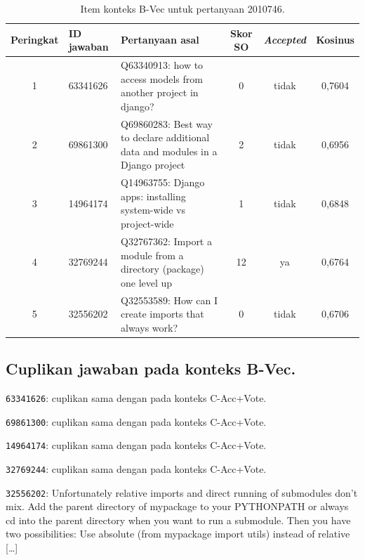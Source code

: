 \begin{table}[!htbp]
\centering
\scriptsize
\caption{Item konteks B-Vec untuk pertanyaan 2010746.}
\label{tab:lamp-x-konteks-b}
\renewcommand{\arraystretch}{1.25}
\begin{tabularx}{\textwidth}{|c|l|>{\raggedright\arraybackslash}X|c|c|c|}
\hline
\textbf{Peringkat} & \textbf{ID jawaban} & \textbf{Pertanyaan asal} & \textbf{Skor SO} & \textbf{\emph{Accepted}} & \textbf{Kosinus} \\
\hline
1 & 63341626 & Q63340913: how to access models from another project in django? & 0 & tidak & 0,7604 \\
\hline
2 & 69861300 & Q69860283: Best way to declare additional data and modules in a Django project & 2 & tidak & 0,6956 \\
\hline
3 & 14964174 & Q14963755: Django apps: installing system-wide vs project-wide & 1 & tidak & 0,6848 \\
\hline
4 & 32769244 & Q32767362: Import a module from a directory (package) one level up & 12 & ya & 0,6764 \\
\hline
5 & 32556202 & Q32553589: How can I create imports that always work? & 0 & tidak & 0,6706 \\
\hline
\end{tabularx}
\end{table}
\subsection{Cuplikan jawaban pada konteks B-Vec.}
\begin{description}\small
\item[1.] \texttt{63341626}: cuplikan sama dengan pada konteks C-Acc+Vote.
\item[2.] \texttt{69861300}: cuplikan sama dengan pada konteks C-Acc+Vote.
\item[3.] \texttt{14964174}: cuplikan sama dengan pada konteks C-Acc+Vote.
\item[4.] \texttt{32769244}: cuplikan sama dengan pada konteks C-Acc+Vote.
\item[5.] \texttt{32556202}: Unfortunately relative imports and direct running of submodules don't mix.\allowbreak{} Add the parent directory of mypackage to your PYTHONPATH or always cd into the parent directory when you want to run a submodule.\allowbreak{} Then you have two possibilities:\allowbreak{} Use absolute (from mypackage import utils)\allowbreak{} instead of relative [\ldots]
\end{description}

